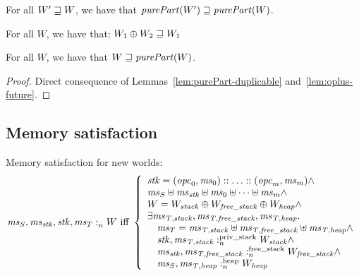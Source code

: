 \documentclass[a4paper]{article}
\begin{document}
\begin{lemma}
  \label{lem:purePart-mono}
 For all $W'\sqsupseteq W$, we have that $\purePart{W'} \future \purePart{W}$.
\end{lemma}

\begin{lemma}
  \label{lem:oplus-future}
  For all $W$, we have that:
  $W_1 \oplus W_2 \sqsupseteq W_1$
\end{lemma}

\begin{lemma}
  \label{lem:world-fut-purePart}
  For all $W$, we have that $W \future \purePart{W}$.
\end{lemma}
\begin{proof}
  Direct consequence of Lemmas~\ref{lem:purePart-duplicable}
  and~\ref{lem:oplus-future}.
\end{proof}

\subsection{Memory satisfaction}
Memory satisfaction for new worlds:
\[
  \mathit{ms}_S,\mathit{ms}_{\mathit{stk}},\mathit{stk},\mathit{ms}_T :_{n}^{}W \text{ iff } 
  \left\{
    \begin{array}{l}
      \mathit{stk} = (\mathit{opc}_0,\mathit{ms}_0):: \dots :: (\mathit{opc}_m,\mathit{ms}_m) \wedge \\
      \mathit{ms}_S \uplus \mathit{ms}_{\mathit{stk}} \uplus \mathit{ms}_0 \uplus \dots \uplus \mathit{ms}_m  \wedge\\
      W = W_{\mathit{stack}} \oplus W_{\mathit{free\_stack}} \oplus W_{\mathit{heap}} \wedge\\
      \exists \mathit{ms}_{\mathit{T,stack}}, \mathit{ms}_{\mathit{T,free\_stack}}, \mathit{ms}_{\mathit{T,heap}}\ldotp \\
      \quad \mathit{ms}_T = \mathit{ms}_{\mathit{T,stack}} \uplus \mathit{ms}_{\mathit{T,free\_stack}} \uplus \mathit{ms}_{\mathit{T,heap}} \wedge \\
      \quad \mathit{stk},\mathit{ms}_{\mathit{T,stack}} :_{n}^{\text{priv\_stack}}W_{\mathit{stack}} \wedge \\
      \quad \mathit{ms}_{\mathit{stk}},\mathit{ms}_{\mathit{T,free\_stack}} :_{n}^{\text{free\_stack}}W_{\mathit{free\_stack}} \wedge \\
      \quad \mathit{ms}_S,\mathit{ms}_{\mathit{T,heap}} :_{n}^{\text{heap}}W_{\mathit{heap}}
    \end{array}
  \right.
\]
\end{document}
